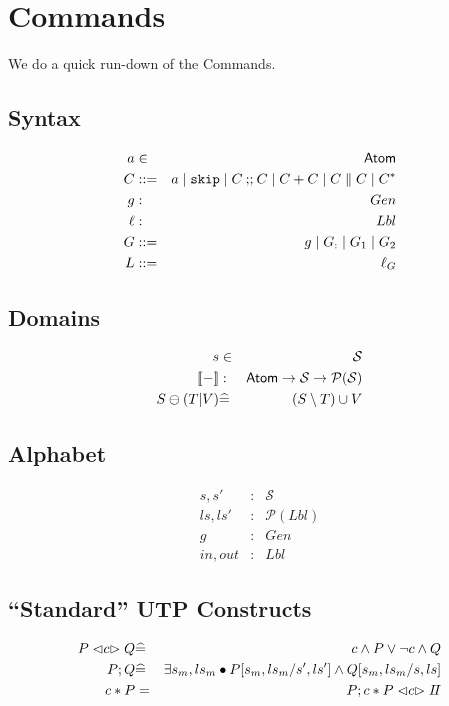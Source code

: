 \section{Commands}

We do a quick run-down of the Commands\cite{conf/popl/Dinsdale-YoungBGPY13}.

\subsection{Syntax}

\begin{eqnarray*}
   a &\in& \textsf{Atom}
\\ C &::=& a \mid \texttt{skip} \mid C \mathbin{;\!;} C \mid C+C \mid C \parallel C \mid C^*
\\ g &:& Gen
\\ \ell &:& Lbl
\\ G &::=&  g \mid G_{:} \mid G_1 \mid G_2
\\ L &::=& \ell_G
\end{eqnarray*}

\subsection{Domains}
\begin{eqnarray*}
   s &\in& \mathcal S
\\ \sem{-} &:& \Atom \fun \mathcal S \fun \mathcal P(\mathcal S)
\\ S \ominus (T|V)
   &\defs& (S \setminus T) \cup V
\end{eqnarray*}

\subsection{Alphabet}

\begin{eqnarray*}
   s, s' &:& \mathcal S
\\ ls, ls' &:& \mathcal P (Lbl)
\\ g &:& Gen
\\ in, out &:& Lbl
\end{eqnarray*}
\subsection{``Standard'' UTP Constructs}

\begin{eqnarray*}
   P \mathrel{\lhd{c}\rhd} Q
   &\widehat=&
   c \land P \lor \lnot c \land Q
\\ P ; Q
   &\widehat=&
   \exists s_m,ls_m \bullet P[s_m,ls_m/s',ls'] \land Q[s_m,ls_m/s,ls]
\\ c * P
   &=&
   P ; c * P \mathrel{\lhd{c}\rhd} I\!I
\end{eqnarray*}

